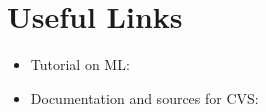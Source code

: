\documentclass{article}
\begin{document}
\section{Useful Links}
\begin{itemize}
 \item  Tutorial on ML: 
  \item Documentation and sources for CVS:

 \end{itemize}
\end{document}
